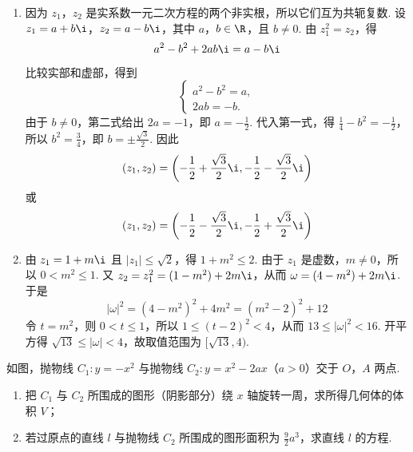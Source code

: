 \begin{solution}
\begin{enumerate}
\item 因为 \(z_1\)，\(z_2\) 是实系数一元二次方程的两个非实根，所以它们互为共轭复数. 设 \(z_1=a+b\i\)，\(z_2=a-b\i\)，其中 \(a\)，\(b\in\R\)，且 \(b\neq0\). 由 \(z_1^2=z_2\)，得
\[
a^2-b^2+2ab\i=a-b\i
\]
比较实部和虚部，得到
\[
\begin{cases}
a^2-b^2=a,\\
2ab=-b.
\end{cases}
\]
由于 \(b\neq0\)，第二式给出 \(2a=-1\)，即 \(a=-\frac12\). 代入第一式，得 \(\frac14-b^2=-\frac12\)，所以 \(b^2=\frac34\)，即 \(b=\pm\frac{\sqrt3}{2}\). 因此
\[
(z_1,z_2)=\left(-\frac12+\frac{\sqrt3}{2}\i,-\frac12-\frac{\sqrt3}{2}\i\right)
\]
或
\[
(z_1,z_2)=\left(-\frac12-\frac{\sqrt3}{2}\i,-\frac12+\frac{\sqrt3}{2}\i\right)
\]
\item 由 \(z_1=1+m\i\) 且 \(|z_1|\leqslant\sqrt2\)，得 \(1+m^2\leqslant2\). 由于 \(z_1\) 是虚数，\(m\neq0\)，所以 \(0<m^2\leqslant1\). 又 \(z_2=z_1^2=(1-m^2)+2m\i\)，从而 \(\omega=(4-m^2)+2m\i\). 于是
\[
|\omega|^2=(4-m^2)^2+4m^2=(m^2-2)^2+12
\]
令 \(t=m^2\)，则 \(0<t\leqslant1\)，所以 \(1\leqslant(t-2)^2<4\)，从而 \(13\leqslant|\omega|^2<16\). 开平方得 \(\sqrt{13}\leqslant|\omega|<4\)，故取值范围为 \([\sqrt{13},4)\).
\end{enumerate}
\end{solution}

\reuseproblemnumber
\begin{problem}[B]
如图，抛物线 \(C_1:y=-x^2\) 与抛物线 \(C_2:y=x^2-2ax\)（\(a>0\)）交于 \(O\)，\(A\) 两点.

\begin{enumerate}
\item 把 \(C_1\) 与 \(C_2\) 所围成的图形（阴影部分）绕 \(x\) 轴旋转一周，求所得几何体的体积 \(V\)；
\item 若过原点的直线 \(l\) 与抛物线 \(C_2\) 所围成的图形面积为 \(\frac{9}{2}a^{3}\)，求直线 \(l\) 的方程.
\end{enumerate}

\end{problem}

